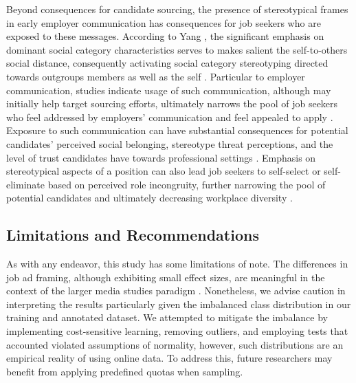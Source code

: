 \documentclass[Royal,sageapa,times]{sagej}
\begin{document}
Beyond consequences for candidate sourcing, the presence of stereotypical frames in early employer communication has consequences for job seekers who are exposed to these messages. According to Yang \citeyear{Yang2015a}, the significant emphasis on dominant social category characteristics serves to makes salient the self-to-others social distance, consequently activating social category stereotyping directed towards outgroups members as well as the self . Particular to employer communication, studies indicate usage of such communication, although may initially help target sourcing efforts, ultimately narrows the pool of job seekers who feel addressed by employers’ communication and feel appealed to apply . Exposure to such communication can have substantial consequences for potential candidates’ perceived social belonging, stereotype threat perceptions, and the level of trust candidates have towards professional settings . Emphasis on stereotypical aspects of a position can also lead job seekers to self-select or self-eliminate based on perceived role incongruity, further narrowing the pool of potential candidates and ultimately decreasing workplace diversity .

\subsection{Limitations and Recommendations\label{limitations_and_recommendations}}
As with any endeavor, this study has some limitations of note. The differences in job ad framing, although exhibiting small effect sizes, are meaningful in the context of the larger media studies paradigm . Nonetheless, we advise caution in interpreting the results particularly given the imbalanced class distribution in our training and annotated dataset. We attempted to mitigate the imbalance by implementing cost-sensitive learning, removing outliers, and employing tests that accounted violated assumptions of normality, however, such distributions are an empirical reality of using online data. To address this, future researchers may benefit from applying predefined quotas when sampling.
\end{document}
